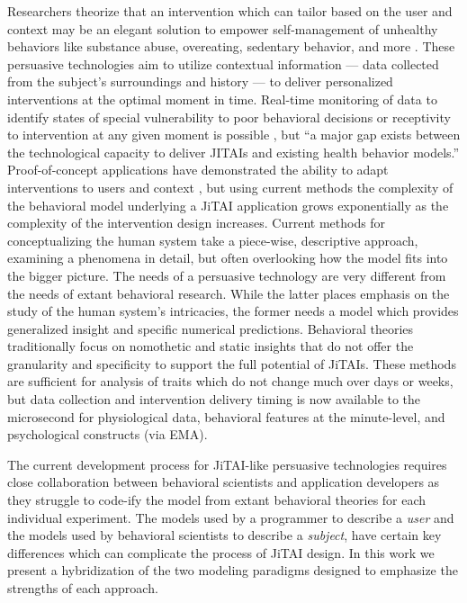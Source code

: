 \documentclass[runningheads,a4paper]{llncs}
\begin{document}
Researchers theorize that an intervention which can tailor based on the user and context may be an elegant solution to empower self-management of unhealthy behaviors like substance abuse, overeating, sedentary behavior, and more \cite{nahum2014}.
These persuasive technologies aim to utilize contextual information --- data collected from the subject's surroundings and history --- to deliver personalized interventions at the optimal moment in time.
Real-time monitoring of data to identify states of special vulnerability to poor behavioral decisions or receptivity to intervention at any given moment is possible \cite{hekler2013realizing}, but ``a major gap exists between the technological capacity to deliver JITAIs and existing health behavior models.'' \cite{nahum2014}
Proof-of-concept applications have demonstrated the ability to adapt interventions to users \cite{dallery2014optimizing} \cite{beck2010challenges} and context \cite{brailsford2010towards} \cite{collins2004conceptual}, but using current methods the complexity of the behavioral model underlying a JiTAI application grows exponentially as the complexity of the intervention design increases. 
Current methods for conceptualizing the human system take a piece-wise, descriptive approach, examining a phenomena in detail, but often overlooking how the model fits into the bigger picture.
The needs of a persuasive technology are very different from the needs of extant behavioral research.
While the latter places emphasis on the study of the human system's intricacies, the former needs a model which provides generalized insight and specific numerical predictions.
Behavioral theories traditionally focus on nomothetic and static insights that do not offer the granularity and specificity to support the full potential of JiTAIs\cite{riley2011healthbehavior}.
These methods are sufficient for analysis of traits which do not change much over days or weeks, but data collection and intervention delivery timing is now available to the microsecond for physiological data, behavioral features at the minute-level, and psychological constructs (via EMA\cite{shiffman2008ecological}).

The current development process for JiTAI-like persuasive technologies requires close collaboration between behavioral scientists and application developers as they struggle to code-ify the model from extant behavioral theories for each individual experiment.
The models used by a programmer to describe a \emph{user} and the models used by behavioral scientists to describe a \emph{subject}, have certain key differences which can complicate the process of JiTAI design.
In this work we present a hybridization of the two modeling paradigms designed to emphasize the strengths of each approach.
\end{document}

